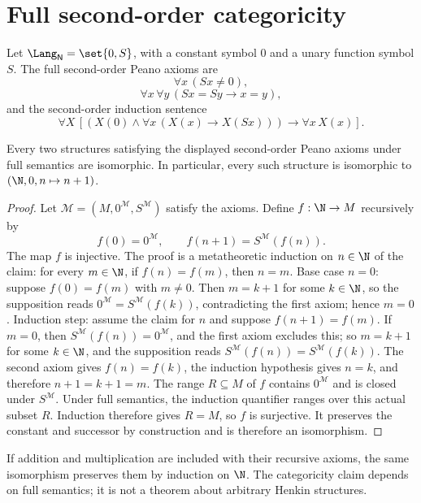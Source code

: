 \section{Full second-order categoricity}
\label{sec:second-order-logic-03}

Let \(\Lang_{\mathsf N}=\set{0,S}\), with a constant symbol \(0\) and a unary
function symbol \(S\).  The full second-order Peano axioms are
\[
  \forall x\,(Sx\ne0),
\]
\[
  \forall x\,\forall y\,(Sx=Sy\to x=y),
\]
and the second-order induction sentence
\[
  \forall X\,
  \left[
    \left(X(0)\land
      \forall x\,(X(x)\to X(Sx))\right)
    \to
    \forall x\,X(x)
  \right].
\]

\begin{theorem}
Every two structures satisfying the displayed second-order Peano axioms under
full semantics are isomorphic.  In particular, every such structure is
isomorphic to \((\N,0,n\mapsto n+1)\).
\end{theorem}

\begin{proof}
Let \(\mathcal M=(M,0^{\mathcal M},S^{\mathcal M})\) satisfy the axioms.  Define
\(f:\N\to M\) recursively by
\[
  f(0)=0^{\mathcal M},
  \qquad
  f(n+1)=S^{\mathcal M}(f(n)).
\]
The map \(f\) is injective.  The proof is a metatheoretic induction on
\(n\in\N\) of the claim: for every \(m\in\N\), if \(f(n)=f(m)\), then
\(n=m\).  Base case \(n=0\): suppose \(f(0)=f(m)\) with \(m\ne0\).  Then
\(m=k+1\) for some \(k\in\N\), so the supposition reads
\(0^{\mathcal M}=S^{\mathcal M}(f(k))\), contradicting the first axiom;
hence \(m=0\).  Induction step: assume the claim for \(n\) and suppose
\(f(n+1)=f(m)\).  If \(m=0\), then
\(S^{\mathcal M}(f(n))=0^{\mathcal M}\), and the first axiom excludes this;
so \(m=k+1\) for some \(k\in\N\), and the supposition reads
\(S^{\mathcal M}(f(n))=S^{\mathcal M}(f(k))\).  The second axiom gives
\(f(n)=f(k)\), the induction hypothesis gives \(n=k\), and therefore
\(n+1=k+1=m\).  The range \(R\subseteq M\) of \(f\) contains
\(0^{\mathcal M}\) and is closed under \(S^{\mathcal M}\).  Under full
semantics, the induction quantifier ranges over this actual subset \(R\).
Induction therefore gives \(R=M\), so \(f\) is surjective.  It preserves the
constant and successor by construction and is therefore an isomorphism.
\end{proof}

If addition and multiplication are included with their recursive axioms, the
same isomorphism preserves them by induction on \(\N\).  The categoricity claim
depends on full semantics; it is not a theorem about arbitrary Henkin
structures.

